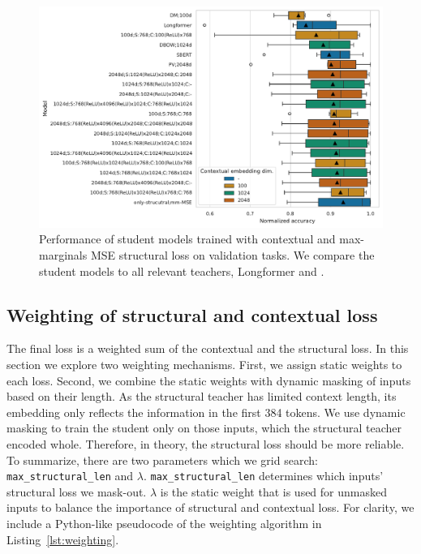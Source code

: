 \begin{figure}

  \includegraphics[width=\textwidth]{img/projections_contextual_mm_mse.pdf}

  \caption{Performance of student models trained with contextual and
  max-marginals MSE structural loss on validation tasks. We compare the student
  models to all relevant teachers, Longformer and
  .}

  \label{fig:mm_mse_contextual_projections}

\end{figure}

\subsection{Weighting of structural and contextual
loss}\label{section:weighting_experiments}

The final loss is a weighted sum of the contextual and the structural loss. In
this section we explore two weighting mechanisms. First, we assign static
weights to each loss. Second, we combine the static weights with dynamic
masking of inputs based on their length. As the structural teacher has limited
context length, its embedding only reflects the information in the first 384
tokens. We use dynamic masking to train the student only on those inputs, which
the structural teacher encoded whole. Therefore, in theory, the structural loss
should be more reliable. To summarize, there are two parameters which we grid
search: \texttt{max\_structural\_len} and $\lambda$.
\texttt{max\_structural\_len} determines which inputs' structural loss we
mask-out. $\lambda$ is the static weight that is used for unmasked inputs to
balance the importance of structural and contextual loss. For clarity, we
include a Python-like pseudocode of the weighting algorithm in
Listing~\ref{lst:weighting}.

